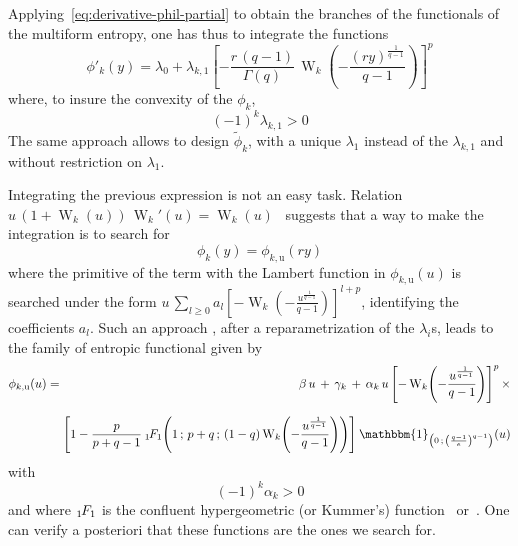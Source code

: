 \documentclass[entropy,article,submit,moreauthors,pdftex]{Definitions/mdpi}
\newcommand{\SZ}[1]{{\color{blue} #1}}                                       %
\def\X{\mathcal{X}}%
\def\un{\mathbbm{1}}%
\def\W{\operatorname{W}} %
\newcommand{\hypgeom}[2]{\mbox{}_{#1}\hspace{-1pt}F_{#2}}%
\def\u{\mathrm{u}}
\begin{document}
\SZ{Applying~\eqref{eq:derivative-phil-partial}  to  obtain  the branches  of  the
  functionals  of the  multiform entropy,  one}  has thus  to \SZ{integrate  the
  functions}
%
\[
\phi'_k(y) = \lambda_0  + \lambda_{k,1} \left[ - \frac{r \, (q-1)}{\Gamma(q)}  \, \W_k\left( -
    \frac{\left( r y \right)^{\frac{1}{q-1}}}{q-1}
\right) \right]^p
\]
%
where, to insure the convexity of the $\phi_k$,
%
\[
(-1)^k \lambda_{k,1} > 0
\]
%
The  same  approach  allows  to   design  $\widetilde{\phi}_k$,  with  a  unique
$\lambda_1$  instead  of  the  $\lambda_{k,1}$ \SZ{and  without  restriction  on
  $\lambda_1$}.

Integrating  the previous  expression  is  not an  easy  task.   Relation $u  \,
(1+\W_k(u)) \, \W_k'(u) =  \W_k(u)$~\cite[Eq.~3.2]{CorGon96} suggests that a way
to make the  integration is to search for\SZ{
%
\[
\phi_k(y) = \phi_{k,\u}\left( r y \right)
\]
%
where the primitive  of the term with the Lambert  function in} $\phi_{k,\u}(u)$
is searched  \SZ{under the form  $u \, \sum_{l \ge  0} a_l \left[-  \W_k\left( -
    \frac{u^{\frac{1}{q-1}}}{q-1}   \right)   \right]^{l+p}$,  identifying   the
  coefficients $a_l$.}
  Such an approach\SZ{, after  a reparametrization of
  the $\lambda_i$s,}  leads to  the family of  entropic functional \SZ{given by}
%
\begin{eqnarray*}
\phi_{k,\u}(u) & = & \beta \, u \, + \, \gamma_k%
%
\, + \,  \alpha_k \,     u  \, \left[    -   \W_k\left(   -
  \frac{u^{\frac{1}{q-1}}}{q-1} \right) \right]^p \, \times
\\[2.5mm]
&&\hspace{-2.5mm}\left[ 1 - \frac{p}{p+q-1} \:
  \hypgeom{1}{1}\left(  1 \,  ; \,  p+q \,  ; \,  (1-q) \W_k  \left( -
  \frac{u^{\frac{1}{q-1}}}{q-1}  \right)   \right)  \right] \: \un_{\left(  0   \,  ;  \,
  \left( \frac{q-1}{e} \right)^{q-1} \right)}(u)
\end{eqnarray*}
%
\SZ{with $$(-1)^k  \alpha_k > 0$$  and where $\hypgeom{1}{1}$ is  the confluent
hypergeometric (or Kummer's) function~\cite[\S~13]{AbrSte70} or~\cite[\S~9.2]{GraRyz15}}.
One can verify a posteriori that these functions are the ones we search for.
%
%
\end{document}
